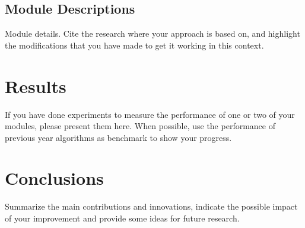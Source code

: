 \documentclass[runningheads,a4paper]{llncs}
\begin{document}
\subsection{Module Descriptions}
Module details. Cite the research where your approach is based on, and highlight the modifications that you have made to get it working in this context.
\section{Results}
If you have done experiments to measure the performance of one or two of your modules, please present them here.
When possible, use the performance of previous year algorithms as benchmark to show your progress.
\section{Conclusions}
Summarize the main contributions and innovations, indicate the possible impact of your improvement and 
provide some ideas for
future research.


\end{document}
